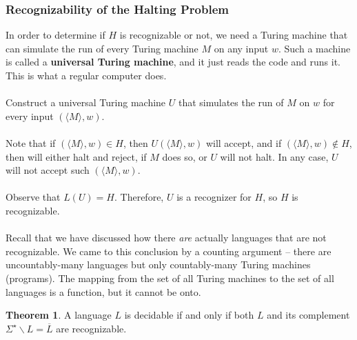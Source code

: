 \documentclass[]{article}
\theoremstyle{definition}
\newtheorem*{theorem}{Theorem}
\newcommand{\lecture}[1]{\marginpar{{\footnotesize $\leftarrow$ \underline{#1}}}}
\begin{document}
    \subsubsection{Recognizability of the Halting Problem} \lecture{November 16, 2013}
      In order to determine if $H$ is recognizable or not, we need a Turing machine that can simulate the run of every Turing machine $M$ on any input $w$. Such a machine is called a \textbf{universal Turing machine}, and it just reads the code and runs it. This is what a regular computer does.
      \\ \\
      Construct a universal Turing machine $U$ that simulates the run of $M$ on $w$ for every input $(\langle M \rangle, w)$.
      \\ \\
      Note that if $(\langle M \rangle, w) \in H$, then $U(\langle M \rangle, w)$ will accept, and if $(\langle M \rangle, w) \not \in H$, then will either halt and reject, if $M$ does so, or $U$ will not halt. In any case, $U$ will not accept such $(\langle M \rangle, w)$.
      \\ \\
      Observe that $L(U) = H$. Therefore, $U$ is a recognizer for $H$, so $H$ is recognizable.
      \\ \\
      Recall that we have discussed how there \emph{are} actually languages that are not recognizable. We came to this conclusion by a counting argument -- there are uncountably-many languages but only countably-many Turing machines (programs). The mapping from the set of all Turing machines to the set of all languages is a function, but it cannot be onto.

      \begin{theorem}
        A language $L$ is decidable if and only if both $L$ and its complement $\Sigma^\star \backslash L = \overline{L}$ are recognizable.
      \end{theorem}
\end{document}
